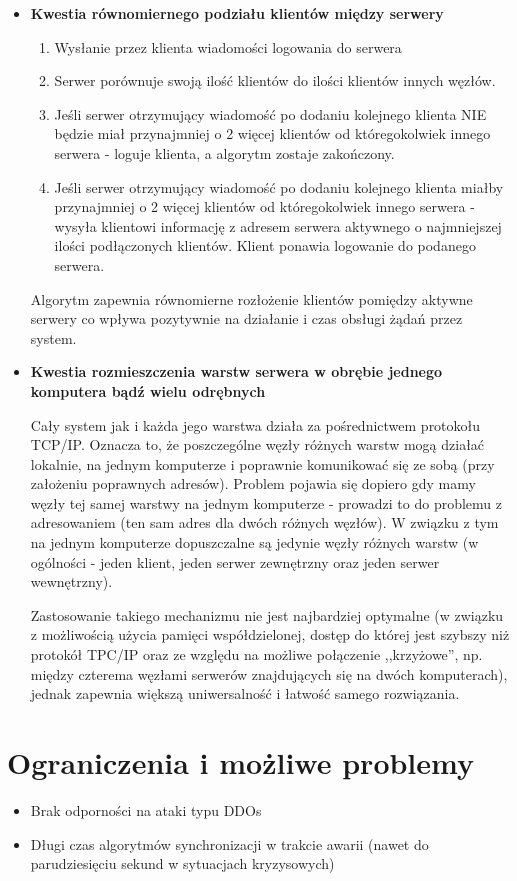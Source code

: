 {\begin{itemize}
\item \textbf{Kwestia równomiernego podziału klientów między serwery}
\begin{enumerate}
\item Wysłanie przez klienta wiadomości logowania do serwera
\item Serwer porównuje swoją ilość klientów do ilości klientów innych węzłów.
\item Jeśli serwer otrzymujący wiadomość po dodaniu kolejnego klienta NIE będzie miał przynajmniej o 2 więcej klientów od któregokolwiek innego serwera - loguje klienta, a algorytm zostaje zakończony.
\item Jeśli serwer otrzymujący wiadomość po dodaniu kolejnego klienta miałby przynajmniej o 2 więcej klientów od któregokolwiek innego serwera - wysyła klientowi informację z adresem serwera aktywnego o najmniejszej ilości podłączonych klientów. Klient ponawia logowanie do podanego serwera.
\end{enumerate}
\par{Algorytm zapewnia równomierne rozłożenie klientów pomiędzy aktywne serwery co wpływa pozytywnie na działanie i czas obsługi żądań przez system.}

\item \textbf{Kwestia rozmieszczenia warstw serwera w obrębie jednego komputera bądź wielu odrębnych}
\par{Cały system jak i każda jego warstwa działa za pośrednictwem protokołu TCP/IP. Oznacza to, że poszczególne węzły różnych warstw mogą działać lokalnie, na jednym komputerze i poprawnie komunikować się ze sobą (przy założeniu poprawnych adresów). Problem pojawia się dopiero gdy mamy węzły tej samej warstwy na jednym komputerze - prowadzi to do problemu z adresowaniem (ten sam adres dla dwóch różnych węzłów). W związku z tym na jednym komputerze dopuszczalne są jedynie węzły różnych warstw (w ogólności - jeden klient, jeden serwer zewnętrzny oraz jeden serwer wewnętrzny).}

\par{Zastosowanie takiego mechanizmu nie jest najbardziej optymalne (w związku z możliwością użycia pamięci współdzielonej, dostęp do której jest szybszy niż protokół TPC/IP oraz ze względu na możliwe połączenie ,,krzyżowe'', np. między czterema węzłami serwerów znajdujących się na dwóch komputerach), jednak zapewnia większą uniwersalność i łatwość samego rozwiązania.}
\end{itemize}

\section[Ograniczenia i możliwe problemy]{Ograniczenia i możliwe problemy}
\begin{itemize}
\item Brak odporności na ataki typu DDOs
\item Długi czas algorytmów synchronizacji w trakcie awarii (nawet do parudziesięciu sekund w sytuacjach kryzysowych)


\end{itemize}}

